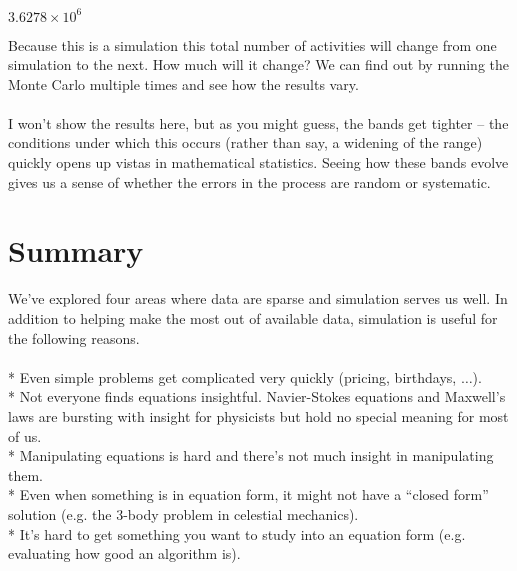 \documentclass{article}
\begin{document}
\begin{doublespace}
\noindent\(3.6278\times 10^6\)
\end{doublespace}

Because this is a simulation this total number of activities will change from one simulation to the next. How much will it change? We can find out
by running the Monte Carlo multiple times and see how the results vary. \\
\\
I won{'}t show the results here, but as you might guess, the bands get tighter -- the conditions under which this occurs (rather than say, a widening
of the range) quickly opens up vistas in mathematical statistics. Seeing how these bands evolve gives us { }a sense of whether the errors in the
process are random or systematic.

\section*{Summary}

We{'}ve explored four areas where data are sparse and simulation serves us well. In addition to helping make the most out of available data, simulation
is useful for the following reasons.\\
\\
* Even simple problems get complicated very quickly (pricing, birthdays, $\ldots $).\\
* Not everyone finds equations insightful. Navier-Stokes equations and Maxwell{'}s laws are bursting with insight for physicists but hold no special
meaning for most of us.\\
* Manipulating equations is hard and there{'}s not much insight in manipulating them.\\
* Even when something is in equation form, it might not have a {``}closed form{''} solution (e.g. the 3-body problem in celestial mechanics).\\
* It{'}s hard to get something you want to study into an equation form (e.g. evaluating how good an algorithm is).\\
\end{document}
